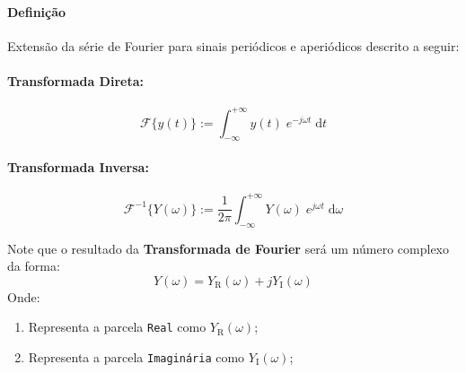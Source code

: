 \documentclass{article}
\begin{document}
                \paragraph{Definição}Extensão da série de Fourier para sinais periódicos e aperiódicos descrito a seguir:
                    \begin{multicols}{2}
                        \raggedcolumns
                        \paragraph{Transformada Direta:}
                            \begin{equation}
                                \boxed{
                                    \mathcal{F} \{ y(t) \} := 
                                    \int_{-\infty}^{+\infty} y(t) \; e^{-j\omega t} \; \text{d}t
                                }
                            \end{equation}
        
                        \columnbreak
        
                        \paragraph{Transformada Inversa:}
                            \begin{equation}
                                \boxed{
                                    \mathcal{F}^{-1}\{ Y(\omega) \} := 
                                    \frac{1}{2\pi} \int_{-\infty}^{+\infty} Y(\omega) \; e^{j\omega t} \; \text{d} \omega
                                }
                            \end{equation}
                    \end{multicols}\noindent
                Note que o resultado da \textbf{Transformada de Fourier} será um número complexo da forma:
                    \begin{equation*}
                        \boxed{
                            Y(\omega) = Y_{\text{R}}(\omega) + j Y_{\text{I}}(\omega)
                        }
                    \end{equation*}
                Onde:
                    \begin{enumerate}[noitemsep]
                        \item Representa a parcela \texttt{Real} como $Y_{\text{R}}(\omega)$;

                        \item Representa a parcela \texttt{Imaginária} como $Y_{\text{I}}(\omega)$;
                    \end{enumerate}
\end{document}
